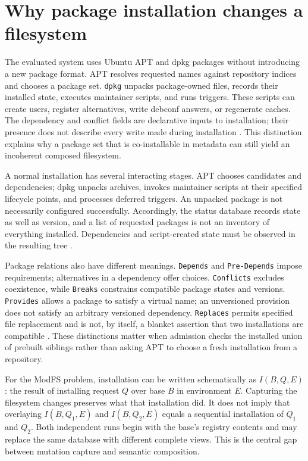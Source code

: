 \section{Why package installation changes a filesystem}

The evaluated system uses Ubuntu \ac{APT} and dpkg packages without introducing a new package format. \ac{APT} resolves requested names against repository indices and chooses a package set. \texttt{dpkg} unpacks package-owned files, records their installed state, executes maintainer scripts, and runs triggers. These scripts can create users, register alternatives, write debconf answers, or regenerate caches. The dependency and conflict fields are declarative inputs to installation; their presence does not describe every write made during installation \autocite{man-deb-control,man-dpkg,man-deb-triggers}. This distinction explains why a package set that is co-installable in metadata can still yield an incoherent composed filesystem.

A normal installation has several interacting stages. \ac{APT} chooses candidates and dependencies; dpkg unpacks archives, invokes maintainer scripts at their specified lifecycle points, and processes deferred triggers. An unpacked package is not necessarily configured successfully. Accordingly, the status database records state as well as version, and a list of requested packages is not an inventory of everything installed. Dependencies and script-created state must be observed in the resulting tree \autocite{man-dpkg,man-deb-triggers}.

Package relations also have different meanings. \texttt{Depends} and \texttt{Pre-Depends} impose requirements; alternatives in a dependency offer choices. \texttt{Conflicts} excludes coexistence, while \texttt{Breaks} constrains compatible package states and versions. \texttt{Provides} allows a package to satisfy a virtual name; an unversioned provision does not satisfy an arbitrary versioned dependency. \texttt{Replaces} permits specified file replacement and is not, by itself, a blanket assertion that two installations are compatible \autocite{debian-policy-relationships}. These distinctions matter when admission checks the installed union of prebuilt siblings rather than asking \ac{APT} to choose a fresh installation from a repository.

For the ModFS problem, installation can be written schematically as $I(B,Q,E)$: the result of installing request $Q$ over base $B$ in environment $E$. Capturing the filesystem changes preserves what that installation did. It does not imply that overlaying $I(B,Q_1,E)$ and $I(B,Q_2,E)$ equals a sequential installation of $Q_1$ and $Q_2$. Both independent runs begin with the base's registry contents and may replace the same database with different complete views. This is the central gap between mutation capture and semantic composition.

